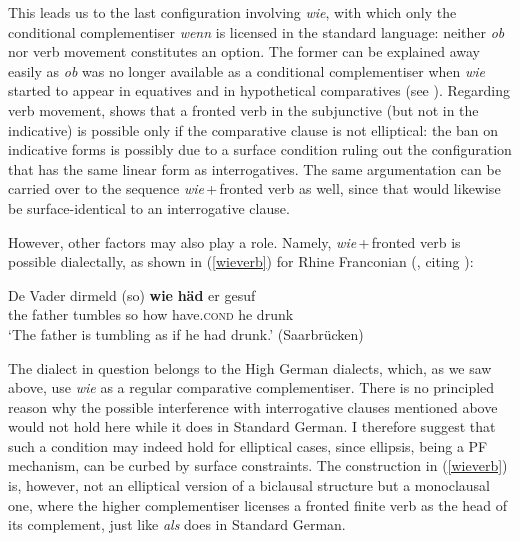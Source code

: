 This leads us to the last configuration involving \textit{wie}, with which only the conditional complementiser \textit{wenn} is licensed in the standard language: neither \textit{ob} nor verb movement constitutes an option. The former can be explained away easily as \textit{ob} was no longer available as a conditional complementiser when \textit{wie} started to appear in equatives and in hypothetical comparatives (see \citealt{jaeger2018}). Regarding verb movement, \citet[487]{jaeger2010} shows that a fronted verb in the subjunctive (but not in the indicative) is possible only if the comparative clause is not elliptical: the ban on indicative forms is possibly due to a surface condition ruling out the configuration that has the same linear form as interrogatives. The same argumentation can be carried over to the sequence \textit{wie}\,+\,fronted verb as well, since that would likewise be surface-identical to an interrogative clause. 

However, other factors may also play a role. Namely, \textit{wie}\,+\,fronted verb is possible dialectally, as shown in (\ref{wieverb}) for Rhine Franconian (\citealt[348, ex. 576]{jaeger2018}, citing \citealt[331]{steitz1981}):

\ea \gll De Vader dirmeld (so) \textbf{wie} \textbf{häd} er gesuf \label{wieverb}\\
the father tumbles \phantom{(}so how have.\textsc{cond} he drunk\\
\glt `The father is tumbling as if he had drunk.' (Saarbrücken)
\z

The dialect in question belongs to the High German dialects, which, as we saw above, use \textit{wie} as a regular comparative complementiser. There is no principled reason why the possible interference with interrogative clauses mentioned above would not hold here while it does in Standard German. I therefore suggest that such a condition may indeed hold for elliptical cases, since ellipsis, being a PF mechanism, can be curbed by surface constraints. The construction in (\ref{wieverb}) is, however, not an elliptical version of a biclausal structure but a monoclausal one, where the higher complementiser licenses a fronted finite verb as the head of its complement, just like \textit{als} does in Standard German.

